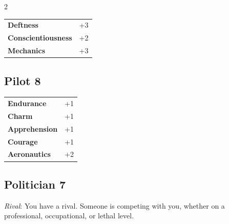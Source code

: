 \begin{multicols}{2}
\begin{tcolorbox}
\begin{tabular}{@{}ll@{}}
    \textbf{Deftness} & +3\\
    \textbf{Conscientiousness} & +2\\
    \textbf{Mechanics} & +3\\
\end{tabular}


\end{tcolorbox}

\begin{tcolorbox}
    \subsection*{Pilot \hfill \small{8 }}
    \tcblower




\begin{tabular}{@{}ll@{}}
    \textbf{Endurance} & +1\\
    \textbf{Charm} & +1\\
    \textbf{Apprehension} & +1\\
    \textbf{Courage} & +1\\
    \textbf{Aeronautics} & +2\\
\end{tabular}


\end{tcolorbox}

\begin{tcolorbox}
    \subsection*{Politician \hfill \small{7 }}
    \tcblower
\textit{Rival}: You have a rival. Someone is competing with you, whether on a professional, occupational, or lethal level.


\end{tcolorbox}
\end{multicols}
